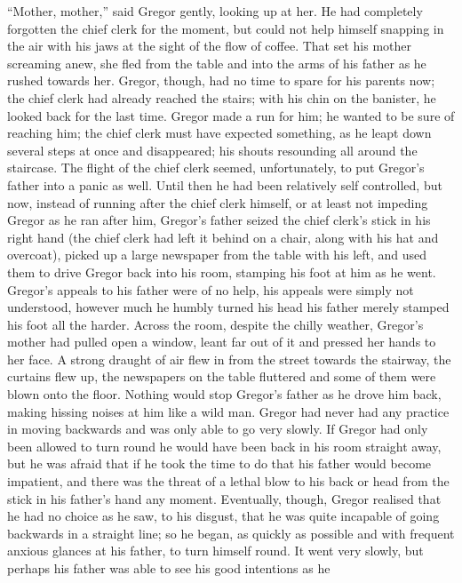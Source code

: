 \documentclass[12pt]{report}
\begin{document}
``Mother, mother,'' said Gregor gently, looking up at her. He had
completely forgotten the chief clerk for the moment, but could not help
himself snapping in the air with his jaws at the sight of the flow of
coffee. That set his mother screaming anew, she fled from the table and
into the arms of his father as he rushed towards her. Gregor, though,
had no time to spare for his parents now; the chief clerk had already
reached the stairs; with his chin on the banister, he looked back for
the last time. Gregor made a run for him; he wanted to be sure of
reaching him; the chief clerk must have expected something, as he leapt
down several steps at once and disappeared; his shouts resounding all
around the staircase. The flight of the chief clerk seemed,
unfortunately, to put Gregor's father into a panic as well. Until then
he had been relatively self controlled, but now, instead of running
after the chief clerk himself, or at least not impeding Gregor as he ran
after him, Gregor's father seized the chief clerk's stick in his right
hand (the chief clerk had left it behind on a chair, along with his hat
and overcoat), picked up a large newspaper from the table with his left,
and used them to drive Gregor back into his room, stamping his foot at
him as he went. Gregor's appeals to his father were of no help, his
appeals were simply not understood, however much he humbly turned his
head his father merely stamped his foot all the harder. Across the room,
despite the chilly weather, Gregor's mother had pulled open a window,
leant far out of it and pressed her hands to her face. A strong draught
of air flew in from the street towards the stairway, the curtains flew
up, the newspapers on the table fluttered and some of them were blown
onto the floor. Nothing would stop Gregor's father as he drove him back,
making hissing noises at him like a wild man. Gregor had never had any
practice in moving backwards and was only able to go very slowly. If
Gregor had only been allowed to turn round he would have been back in
his room straight away, but he was afraid that if he took the time to do
that his father would become impatient, and there was the threat of a
lethal blow to his back or head from the stick in his father's hand any
moment. Eventually, though, Gregor realised that he had no choice as he
saw, to his disgust, that he was quite incapable of going backwards in a
straight line; so he began, as quickly as possible and with frequent
anxious glances at his father, to turn himself round. It went very
slowly, but perhaps his father was able to see his good intentions as he
\end{document}
